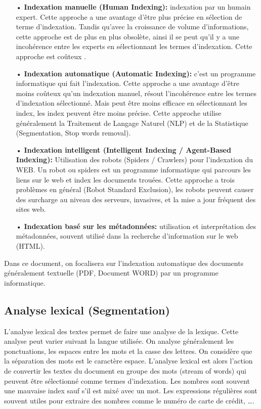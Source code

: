 \begin{itemize}
    \item[•] \textbf{Indexation manuelle (Human Indexing):} indexation par un humain expert. Cette approche a une avantage d'être plus précise en sélection de terme d'indexation. Tandis qu'avec la croissance de volume d'informations, cette approche est de plus en plus obsolète, ainsi il se peut qu'il y a une incohérence entre les experts en sélectionnant les termes d'indexation. Cette approche est coûteux \citep{evaluation-of-ir-system}.
    \item[•] \textbf{Indexation automatique (Automatic Indexing):} c'est un programme informatique qui fait l'indexation. Cette approche a une avantage d'être moins coûteux qu'un indexation manuel, résout l'incohérence entre les termes d'indexation sélectionné. Mais peut être moins efficace en sélectionnant les index, les index peuvent être moins précise. Cette approche utilise généralement la Traitement de Langage Naturel (NLP) et de la Statistique (Segmentation, Stop words removal).
    \item[•] \textbf{Indexation intelligent (Intelligent Indexing / Agent-Based Indexing):} Utilisation des robots (Spiders / Crawlers) pour l'indexation du WEB. Un robot ou spiders est un programme informatique qui parcours les liens sur le web et index les documents trouées. Cette approche a trois problèmes en général (Robot Standard Exclusion), les robots peuvent causer des surcharge au niveau des serveurs, invasives, et la mise a jour fréquent des sites web.
    \item[•] \textbf{Indexation basé sur les métadonnées:} utilisation et interprétation des métadonnées, souvent utilisé dans la recherche d'information sur le web (HTML).
\end{itemize}

Dans ce document, on focalisera sur l'indexation automatique des documents généralement textuelle (PDF, Document WORD) par un programme informatique.

\subsection{Analyse lexical (Segmentation)}
L'analyse lexical des textes permet de faire une analyse de la lexique. Cette analyse peut varier suivant la langue utilisée. On analyse généralement les ponctuations, les espaces entre les mots et la casse des lettres. On considère que la séparation des mots est le caractère espace. L'analyse lexical est alors l'action de convertir les textes du document en groupe des mots (stream of words) qui peuvent être sélectionné comme termes d'indexation. Les nombres sont souvent une mauvaise index sauf s'il est mixé avec un mot. Les expressions régulières sont souvent utiles pour extraire des nombres comme le numéro de carte de crédit, \dots \citep*{modern-ir, approche-semantique}.

